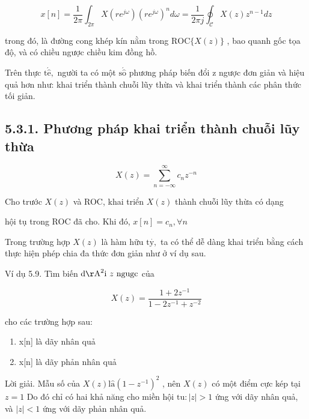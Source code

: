 \documentclass[
  10
]{article}
\begin{document}
\[
x [ n ] = \frac {1}{2 \pi} \int_ {2 \pi} X (r e ^ {j \omega}) \left(r e ^ {j \omega}\right) ^ {n} d \omega = \frac {1}{2 \pi j} \oint_ {\mathcal {C}} X (z) z ^ {n - 1} d z
\]

trong đó, là đường cong khép kín nằm trong
\(\mathrm { R O C } \{ X ( z ) \}\) , bao quanh gốc tọa độ, và có chiều
ngược chiều kim đồng hồ.

Trên thực \(\mathrm { t } \acute { \hat { \mathrm { e } } } ,\) người ta
có một \(\mathrm { s } \acute { \hat { \mathrm { o } } }\) phương pháp
biến đổi z ngược đơn giản và hiệu quả hơn như: khai triển thành chuỗi
lũy thừa và khai triển thành các phân thức tối giản.

\subsection{5.3.1. Phương pháp khai triển thành chuỗi lũy
thừa}\label{phux1b0ux1a1ng-phuxe1p-khai-triux1ec3n-thuxe0nh-chuux1ed7i-lux169y-thux1eeba}

\[
X (z) = \sum_ {n = - \infty} ^ {\infty} c _ {n} z ^ {- n}
\]

Cho trước \(X ( z )\) và ROC, khai triển \(X ( z )\) thành chuỗi lũy
thừa có dạng

hội tụ trong ROC đã cho. Khi đó, \(x [ n ] = c _ { n } , \forall n\)

Trong trường hợp \(X ( z )\) là hàm hữu
\(\mathrm { t { \overset { \cdot } { y } } , }\) ta có thể dễ dàng khai
triển bằng cách thực hiện phép chia đa thức đơn giản như ở ví dụ sau.

Ví dụ 5.9. Tìm biến
\(\mathrm { d } \mathrm { \AA } ^ { 2 } \mathrm { i } \ z \ \mathrm { n g u g c }\)
của

\[
X (z) = \frac {1 + 2 z ^ {- 1}}{1 - 2 z ^ {- 1} + z ^ {- 2}}
\]

cho các trường hợp sau:

\begin{enumerate}
\def\labelenumi{\alph{enumi}.}
\item
  x{[}n{]} là dãy nhân quả
\item
  x{[}n{]} là dãy phản nhân quả
\end{enumerate}

Lời giải. Mẫu số của
\(X ( z ) \mathrm { l } \mathrm { \hat { a } } ( 1 - z ^ { - 1 } ) ^ { 2 }\)
, nên \(X ( z )\) có một điểm cực kép tại \(z = 1\) Do đó chỉ có hai khả
năng cho miền hội \(\mathrm { t u } \colon | z | > 1\) ứng với dãy nhân
quả, và \(| z | < 1\) ứng với dãy phản nhân quả.
\end{document}
